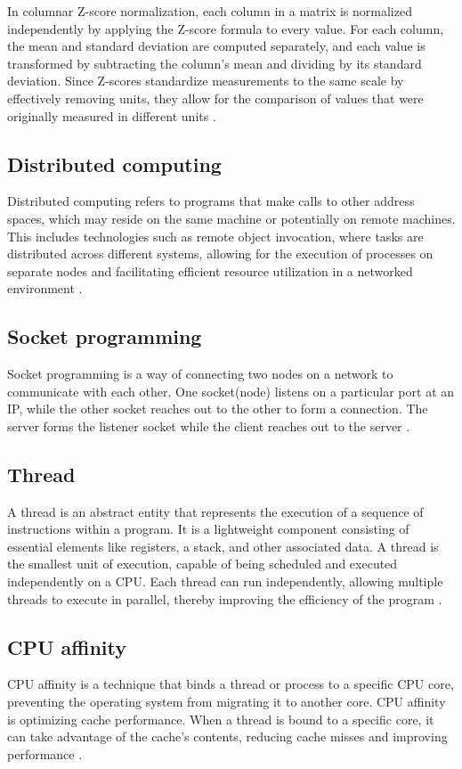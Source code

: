 \documentclass[journal]{./IEEE/IEEEtran}
\begin{document}
In columnar Z-score normalization, each column in a matrix is normalized independently by applying the Z-score formula to every value.
For each column, the mean and standard deviation are computed separately, and each value is transformed by subtracting the column's mean and dividing by its standard deviation.
Since Z-scores standardize measurements to the same scale by effectively removing units, they allow for the comparison of values that were originally measured in different units \cite{abdi2007z}.

\subsection{Distributed computing}
Distributed computing refers to programs that make calls to other address spaces, which may reside on the same machine or potentially on remote machines. This includes technologies such as remote object invocation, where tasks are distributed across different systems, allowing for the execution of processes on separate nodes and facilitating efficient resource utilization in a networked environment
\cite{waldo1996note}.

\subsection{Socket programming}
Socket programming is a way of connecting two nodes on a network to communicate with each other. One socket(node) listens on a particular port at an IP, while the other socket reaches out to the other to form a connection. The server forms the listener socket while the client reaches out to the server \cite{socketc}.

\subsection{Thread}
A thread is an abstract entity that represents the execution of a sequence of instructions within a program.
It is a lightweight component consisting of essential elements like registers, a stack, and other associated data.
A thread is the smallest unit of execution, capable of being scheduled and executed independently on a CPU.
Each thread can run independently, allowing multiple threads to execute in parallel, thereby improving the efficiency of the program \cite{lewis1996pthreads}.

\subsection{CPU affinity}
CPU affinity is a technique that binds a thread or process to a specific CPU core, preventing the operating system from migrating it to another core.
CPU affinity is optimizing cache performance.
When a thread is bound to a specific core, it can take advantage of the cache's contents, reducing cache misses and improving performance \cite{love2003kernel}.
\end{document}
